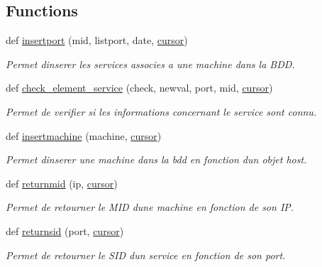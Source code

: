 \subsection*{Functions}
\begin{DoxyCompactItemize}
\item 
def \hyperlink{namespacescan__without__thread_a6dc6e0ce83894b254490209a4f6b72bb}{insertport} (mid, listport, date, \hyperlink{namespacescan__without__thread_ab96035c23ecba59ad9570c46c57b7aa0}{cursor})
\begin{DoxyCompactList}\small\item\em Permet d\textquotesingle{}inserer les services associes a une machine dans la B\+DD. \end{DoxyCompactList}\item 
def \hyperlink{namespacescan__without__thread_a65e368574867b5d2b119a3ad9c7504eb}{check\+\_\+element\+\_\+service} (check, newval, port, mid, \hyperlink{namespacescan__without__thread_ab96035c23ecba59ad9570c46c57b7aa0}{cursor})
\begin{DoxyCompactList}\small\item\em Permet de verifier si les informations concernant le service sont connu. \end{DoxyCompactList}\item 
def \hyperlink{namespacescan__without__thread_a6e1cbeb62d27456b3b5e9803f02eb088}{insertmachine} (machine, \hyperlink{namespacescan__without__thread_ab96035c23ecba59ad9570c46c57b7aa0}{cursor})
\begin{DoxyCompactList}\small\item\em Permet d\textquotesingle{}inserer une machine dans la bdd en fonction d\textquotesingle{}un objet host. \end{DoxyCompactList}\item 
def \hyperlink{namespacescan__without__thread_a979b78810c1d5ecee955f6c1c3618c6b}{returnmid} (ip, \hyperlink{namespacescan__without__thread_ab96035c23ecba59ad9570c46c57b7aa0}{cursor})
\begin{DoxyCompactList}\small\item\em Permet de retourner le M\+ID d\textquotesingle{}une machine en fonction de son IP. \end{DoxyCompactList}\item 
def \hyperlink{namespacescan__without__thread_adc066120369e8f9d516e17220da6cdcf}{returnsid} (port, \hyperlink{namespacescan__without__thread_ab96035c23ecba59ad9570c46c57b7aa0}{cursor})
\begin{DoxyCompactList}\small\item\em Permet de retourner le S\+ID d\textquotesingle{}un service en fonction de son port. \end{DoxyCompactList}\item 

\end{DoxyCompactItemize}
